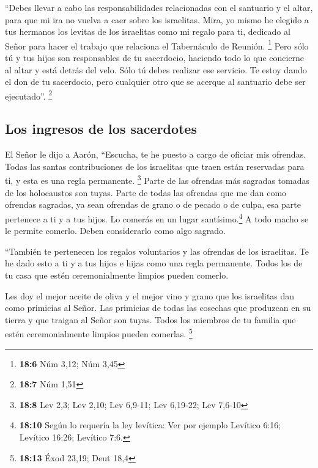  ``Debes llevar a cabo las responsabilidades relacionadas
con el santuario y el altar, para que mi ira no vuelva a caer sobre los
israelitas.  Mira, yo mismo he elegido a tus hermanos los
levitas de los israelitas como mi regalo para ti, dedicado al Señor para
hacer el trabajo que relaciona el Tabernáculo de Reunión. \footnote{\textbf{18:6}
  Núm 3,12; Núm 3,45}  Pero sólo tú y tus hijos son
responsables de tu sacerdocio, haciendo todo lo que concierne al altar y
está detrás del velo. Sólo tú debes realizar ese servicio. Te estoy
dando el don de tu sacerdocio, pero cualquier otro que se acerque al
santuario debe ser ejecutado''. \footnote{\textbf{18:7} Núm 1,51}

\hypertarget{los-ingresos-de-los-sacerdotes}{%
\subsection{Los ingresos de los
sacerdotes}\label{los-ingresos-de-los-sacerdotes}}

 El Señor le dijo a Aarón, ``Escucha, te he puesto a cargo
de oficiar mis ofrendas. Todas las santas contribuciones de los
israelitas que traen están reservadas para ti, y esta es una regla
permanente. \footnote{\textbf{18:8} Lev 2,3; Lev 2,10; Lev 6,9-11; Lev
  6,19-22; Lev 7,6-10}  Parte de las ofrendas más sagradas
tomadas de los holocaustos son tuyas. Parte de todas las ofrendas que me
dan como ofrendas sagradas, ya sean ofrendas de grano o de pecado o de
culpa, esa parte pertenece a ti y a tus hijos.  Lo
comerás en un lugar santísimo.\footnote{\textbf{18:10} Según lo requería
  la ley levítica: Ver por ejemplo Levítico 6:16; Levítico 16:26;
  Levítico 7:6.} A todo macho se le permite comerlo. Deben considerarlo
como algo sagrado.

 ``También te pertenecen los regalos voluntarios y las
ofrendas de los israelitas. Te he dado esto a ti y a tus hijos e hijas
como una regla permanente. Todos los de tu casa que estén
ceremonialmente limpios pueden comerlo.

 Les doy el mejor aceite de oliva y el mejor vino y grano
que los israelitas dan como primicias al Señor.  Las
primicias de todas las cosechas que produzcan en su tierra y que traigan
al Señor son tuyas. Todos los miembros de tu familia que estén
ceremonialmente limpios pueden comerlas. \footnote{\textbf{18:13} Éxod
  23,19; Deut 18,4}

